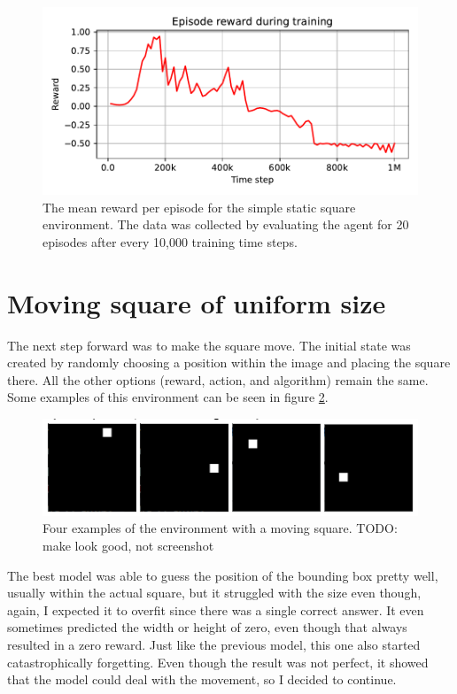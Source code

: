\documentclass[
  digital,     %
  oneside,     %
  nosansbold,  %
  nocolorbold, %
  lof,         %
  lot,         %
]{fithesis4}
\begin{document}
\begin{figure}
    \includegraphics[width=1\linewidth]{graphs/v0.pdf}
    \caption{The mean reward per episode for the simple static square environment. The data was collected by evaluating the agent for 20 episodes after every 10,000 training time steps.}
    \label{fig:v0_rew}
\end{figure}

\section{Moving square of uniform size}
The next step forward was to make the square move. The initial state was created by randomly choosing a position within the image and placing the square there. All the other options (reward, action, and algorithm) remain the same. Some examples of this environment can be seen in figure \ref{fig:env1}.

\begin{figure}
    \includegraphics[width=1\linewidth]{env_examples/env1.png}
    \caption{Four examples of the environment with a moving square. TODO: make look good, not screenshot}
    \label{fig:env1}
\end{figure}

The best model was able to guess the position of the bounding box pretty well, usually within the actual square, but it struggled with the size even though, again, I expected it to overfit since there was a single correct answer. It even sometimes predicted the width or height of zero, even though that always resulted in a zero reward. Just like the previous model, this one also started catastrophically forgetting. Even though the result was not perfect, it showed that the model could deal with the movement, so I decided to continue.
\end{document}

